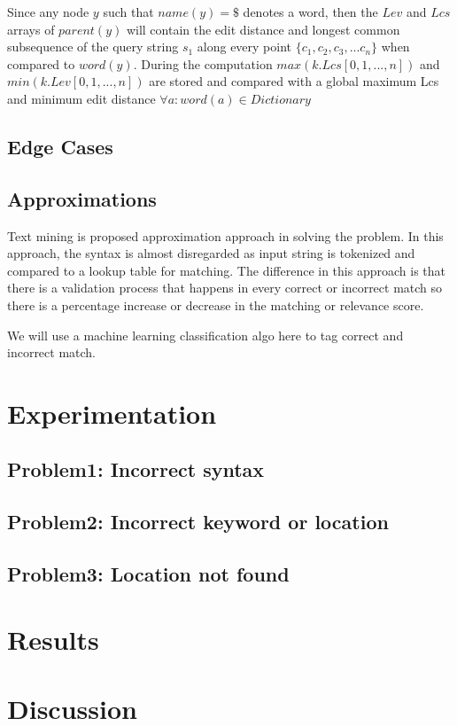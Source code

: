 \documentclass{acm_proc_article-sp}
\begin{document}
Since any node $y$ such that $name(y) = \$$ denotes a word, then the $Lev$ and $Lcs$ arrays of $parent(y)$ will contain the edit distance and longest common subsequence of the query string $s_1$ along every point $\{c_1,c_2,c_3, . . . c_n\}$ when compared to $word(y)$. During the computation $max(k.Lcs[0,1,...,n])$ and $min(k.Lev[0,1,...,n])$ are stored and compared with a global maximum Lcs and minimum edit distance $\forall a : word(a) \in Dictionary$ 

\subsection{Edge Cases} 


\subsection{Approximations}
Text mining is proposed approximation approach in solving the problem. In this approach, the syntax is almost disregarded as input string is tokenized and compared to a lookup table for matching. The difference in this approach is that there is a validation process that happens in every correct or incorrect match so there is a percentage increase or decrease in the matching or relevance score. 

We will use a machine learning classification algo here to tag correct and incorrect match.

\section{Experimentation}
\subsection{Problem1: Incorrect syntax}
\subsection{Problem2: Incorrect keyword or location}
\subsection{Problem3: Location not found}

\section{Results}
\section{Discussion}
\end{document}
